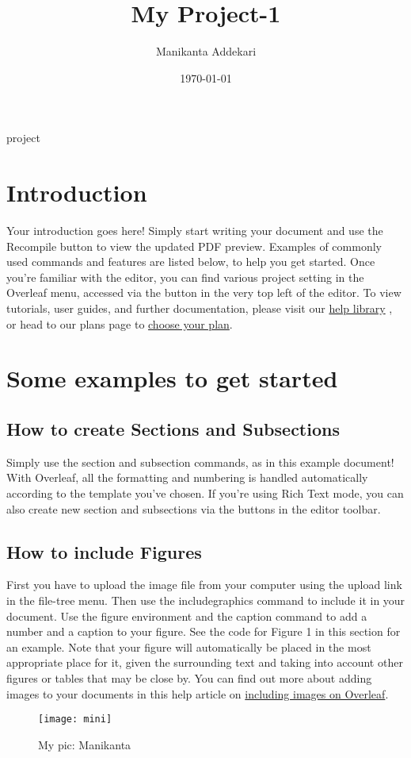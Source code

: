 \documentclass{article}
\title{My Project-1}
\author{Manikanta Addekari}
\date{\today}
\begin{document}
	\maketitle
	 \hspace{4.50cm} {project}
\section{Introduction}
  Your introduction goes here! Simply start writing your document and use the Recompile button to
  view the updated PDF preview. Examples of commonly used commands and features are listed below,
  to help you get started.\vspace{5mm} Once you’re familiar with the editor, you can find various project setting in the Overleaf menu,
  accessed via the button in the very top left of the editor. To view tutorials, user guides, and further
  documentation, please visit our \href{www.#.com}{help library} , or head to our plans page to \href{www.#.com}{choose your plan}.
 \section{Some examples to get started}
 \subsection{How to create Sections and Subsections}
 Simply use the section and subsection commands, as in this example document! With Overleaf, all
 the formatting and numbering is handled automatically according to the template you’ve chosen. If
 you’re using Rich Text mode, you can also create new section and subsections via the buttons in the
 editor toolbar.
 
 \subsection{How to include Figures}
 First you have to upload the image file from your computer using the upload link in the file-tree menu.
 Then use the includegraphics command to include it in your document. Use the figure environment
 and the caption command to add a number and a caption to your figure. See the code for Figure 1 in
 this section for an example.
 Note that your figure will automatically be placed in the most appropriate place for it, given the
 surrounding text and taking into account other figures or tables that may be close by. You can find
 out more about adding images to your documents in this help article on \href{www.#.com}{including images on Overleaf}.
\begin{figure}
	\centering
	\texttt{[image: mini]}
	\caption{My pic: Manikanta}
	\label{fig:mani9}
\end{figure}
\end{document}
